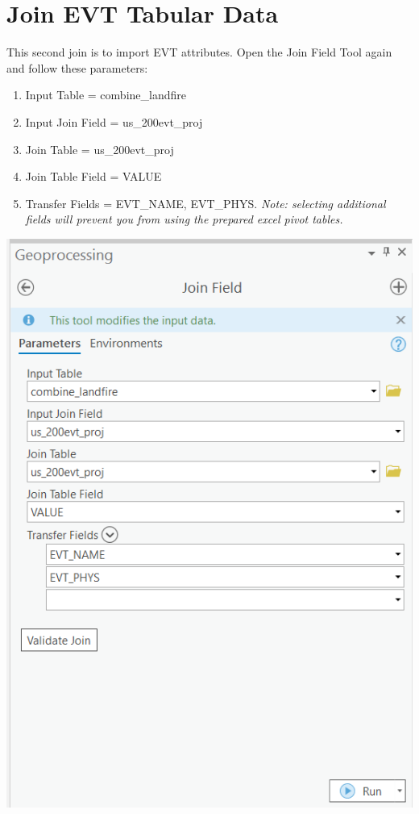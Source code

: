 \documentclass[
]{book}
\providecommand{\tightlist}{%
  \setlength{\itemsep}{0pt}\setlength{\parskip}{0pt}}
\begin{document}
\hypertarget{join-evt-tabular-data}{%
\section{Join EVT Tabular Data}\label{join-evt-tabular-data}}

This second join is to import EVT attributes. Open the Join Field Tool again and follow these parameters:

\begin{enumerate}
\def\labelenumi{\arabic{enumi}.}
\tightlist
\item
  Input Table = combine\_landfire
\item
  Input Join Field = us\_200evt\_proj
\item
  Join Table = us\_200evt\_proj
\item
  Join Table Field = VALUE
\item
  Transfer Fields = EVT\_NAME, EVT\_PHYS. \emph{Note: selecting additional fields will prevent you from using the prepared excel pivot tables.}
\end{enumerate}

\includegraphics[width=1000px]{04_gis_screenshots/9_join_evt}
\end{document}
